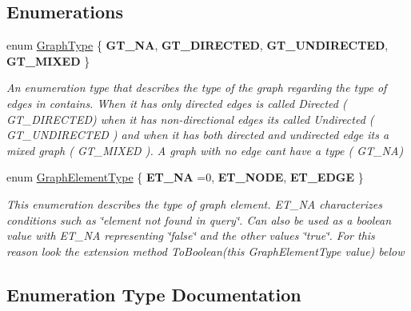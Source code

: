 \subsection*{Enumerations}
\begin{DoxyCompactItemize}
\item 
enum \hyperlink{namespace_graph_library_1_1_generics_a1bac729ea88e6f3925406df33f15d056}{Graph\+Type} \{ {\bfseries G\+T\+\_\+\+N\+A}, 
{\bfseries G\+T\+\_\+\+D\+I\+R\+E\+C\+T\+E\+D}, 
{\bfseries G\+T\+\_\+\+U\+N\+D\+I\+R\+E\+C\+T\+E\+D}, 
{\bfseries G\+T\+\_\+\+M\+I\+X\+E\+D}
 \}\begin{DoxyCompactList}\small\item\em An enumeration type that describes the type of the graph regarding the type of edges in contains. When it has only directed edges is called Directed ( G\+T\+\_\+\+D\+I\+R\+E\+C\+T\+E\+D) when it has non-\/directional edges its called Undirected ( G\+T\+\_\+\+U\+N\+D\+I\+R\+E\+C\+T\+E\+D ) and when it has both directed and undirected edge its a mixed graph ( G\+T\+\_\+\+M\+I\+X\+E\+D ). A graph with no edge can\textquotesingle{}t have a type ( G\+T\+\_\+\+N\+A) \end{DoxyCompactList}
\item 
enum \hyperlink{namespace_graph_library_1_1_generics_a919a165f16deccdd1b3d7e8a93423fbc}{Graph\+Element\+Type} \{ {\bfseries E\+T\+\_\+\+N\+A} =0, 
{\bfseries E\+T\+\_\+\+N\+O\+D\+E}, 
{\bfseries E\+T\+\_\+\+E\+D\+G\+E}
 \}\begin{DoxyCompactList}\small\item\em This enumeration describes the type of graph element. E\+T\+\_\+\+N\+A characterizes conditions such as \char`\"{}element not found in query\char`\"{}. Can also be used as a boolean value with E\+T\+\_\+\+N\+A representing \char`\"{}false\char`\"{} and the other values \char`\"{}true\char`\"{}. For this reason look the extension method To\+Boolean(this Graph\+Element\+Type value) below \end{DoxyCompactList}
\end{DoxyCompactItemize}


\subsection{Enumeration Type Documentation}
\hypertarget{namespace_graph_library_1_1_generics_a919a165f16deccdd1b3d7e8a93423fbc}{}
